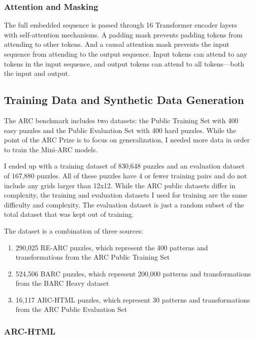 \documentclass[10pt,twocolumn]{article}
\begin{document}
\subsubsection{Attention and Masking}
The full embedded sequence is passed through 16 Transformer encoder
layers with self-attention mechanisms. A padding mask prevents
padding tokens from attending to other tokens. And a causal attention
mask prevents the input sequence from attending to the output
sequence. Input tokens can attend to any tokens in the input
sequence, and output tokens can attend to all tokens—both the input and output.

\subsection{Training Data and Synthetic Data Generation}

The ARC benchmark includes two datasets: the Public Training Set with
400 easy puzzles and the Public Evaluation Set with 400 hard puzzles.
While the point of the ARC Prize is to focus on generalization, I
needed more data in order to train the Mini-ARC models.

I ended up with a training dataset of 830,648 puzzles and an
evaluation dataset of 167,880 puzzles. All of these puzzles have 4 or
fewer training pairs and do not include any grids larger than 12x12.
While the ARC public datasets differ in complexity, the training and
evaluation datasets I used for
training are the same difficulty and complexity. The evaluation
dataset is just a random subset of the total dataset that was kept
out of training.

The dataset is a combination of three sources:
\begin{enumerate}
  \item 290,025 RE-ARC puzzles, which represent the 400 patterns and
    transformations from the ARC Public Training Set
  \item 524,506 BARC puzzles, which represent 200,000 patterns and
    transformations from the BARC Heavy dataset
  \item 16,117 ARC-HTML puzzles, which represent 30 patterns and
    transformations from the ARC Public Evaluation Set
\end{enumerate}

\subsubsection{ARC-HTML}
\end{document}
